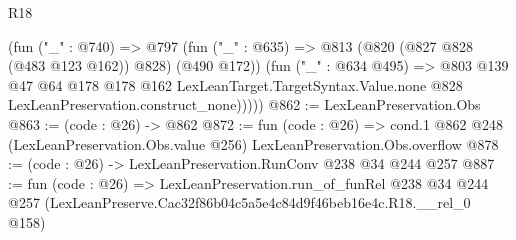 \begin{lexlean}{R18}
\begin{coremodule}
          (fun ("_" : @740) =>
          @797
            (fun ("_" : @635) => @813 (@820 (@827 @828 (@483 @123 @162)) @828) (@490 @172))
            (fun ("_" : @634 @495) =>
            @803
              @139
              @47
              @64
              @178
              @178
              @162
              LexLeanTarget.TargetSyntax.Value.none
              @828
              LexLeanPreservation.construct_none)))))
@862 := LexLeanPreservation.Obs
@863 := (code : @26) -> @862
@872 := fun (code : @26) =>
  cond.{1} @862 @248 (LexLeanPreservation.Obs.value @256) LexLeanPreservation.Obs.overflow
@878 := (code : @26) -> LexLeanPreservation.RunConv @238 @34 @244 @257
@887 := fun (code : @26) =>
  LexLeanPreservation.run_of_funRel
    @238
    @34
    @244
    @257
    (LexLeanPreserve.Cac32f86b04c5a5e4c84d9f46beb16e4c.R18.__rel_0 @158)
\end{coremodule}
\end{lexlean}
